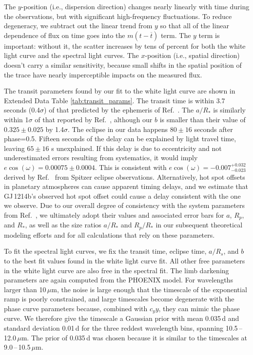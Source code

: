 \documentclass[pdflatex,sn-standardnature]{sn-jnl}%
\begin{document}
The $y$-position (i.e., dispersion direction) changes nearly linearly with time during the observations, but with significant high-frequency fluctuations.  To reduce degeneracy, we subtract out the linear trend from $y$ so that all of the linear dependence of flux on time goes into the $m(t-\overline{t})$ term.  The $y$ term is important: without it,  the scatter increases by tens of percent for both the white light curve and the spectral light curves.  The $x$-position (i.e., spatial direction) doesn't carry a similar sensitivity, because small shifts in the spatial position of the trace have nearly imperceptible impacts on the measured flux.

The transit parameters found by our fit to the white light curve are shown in Extended Data Table \ref{tab:transit_params}.  The transit time is within 3.7 seconds (0.4$\sigma$) of that predicted by the ephemeris of Ref.~\cite{kokori_2022}.  The $a/R_*$ is similarly within 1$\sigma$ of that reported by Ref.~\cite{cloutier21}, although our $b$ is smaller than their value of $0.325 \pm 0.025$ by 1.4$\sigma$.  The eclipse in our data happens $80\pm 16$ seconds after phase=0.5.  Fifteen seconds of the delay can be explained by light travel time, leaving $65 \pm 16$ s unexplained.  If this delay is due to eccentricity and not underestimated errors resulting from systematics, it would imply $e\cos(\omega) = 0.00075 \pm 0.0004$.  This is consistent with $e\cos(\omega)=-0.007_{-0.023}^{+0.032}$ derived by Ref.~\cite{gillon14} from Spitzer eclipse observations.  Alternatively, hot spot offsets in planetary atmospheres can cause apparent timing delays, and we estimate that GJ\,1214b's observed hot spot offset could cause a delay consistent with the one we observe.  Due to our overall degree of consistency with the system parameters from Ref.~\cite{cloutier21}, we ultimately adopt their values and associated error bars for $a$, $R_p$, and $R_*$, as well as the size ratios $a/R_*$ and $R_p/R_*$ in our subsequent theoretical modeling efforts and for all calculations that rely on these parameters.  

To fit the spectral light curves, we fix the transit time, eclipse time, $a/R_{s}$, and $b$ to the best fit values found in the white light curve fit.  All other free parameters in the white light curve are also free in the spectral fit.  The limb darkening parameters are again computed from the PHOENIX model.  For wavelengths larger than 10\,$\mu$m, the noise is large enough that the timescale of the exponential ramp is poorly constrained, and large timescales become degenerate with the phase curve parameters because, combined with $c_y y$, they can mimic the phase curve.  We therefore give the timescale a Gaussian prior with mean 0.035\,d and standard deviation 0.01\,d for the three reddest wavelength bins, spanning 10.5\,--\,12.0\,$\mu$m.  The prior of 0.035\,d was chosen because it is similar to the timescales at 9.0\,--\,10.5\,$\mu$m.  
\end{document}
